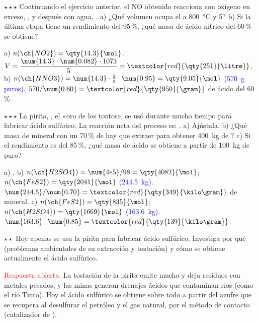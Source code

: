 \begin{exercise}
    \(\star\star\star\) Continuando el ejercicio anterior, el NO obtenido reacciona con oxígeno en exceso, ,
    y después con agua, . a) ¿Qué volumen ocupa el  a \qty{800}{\degreeCelsius} y
    \qty{5}{\atm}? b) Si la última etapa tiene un rendimiento del 95\,\%, ¿qué masa de ácido nítrico del 60\,\% se obtiene?
    \begin{solu}
        a) \textcolor{blue}{\(n(\ch{NO2}) = \qty{14.3}{\mol}\).} \(V = \dfrac{\num{14.3} \cdot \num{0.082} \cdot 1073}{5} =
        \textcolor{red}{\qty{251}{\litre}}\). b) \textcolor{blue}{\(n(\ch{HNO3}) = \num{14.3} \cdot \frac{2}{3} \cdot \num{0.95} =
        \qty{9.05}{\mol}\) (\qty{570}{\gram} puros).} \(570/\num{0.60} = \textcolor{red}{\qty{950}{\gram}}\) de ácido del 60\,\%.
    \end{solu}
\end{exercise}

\begin{exercise}
    \(\star\star\star\) La pirita, , el «oro de los tontos», se usó durante mucho tiempo para fabricar ácido sulfúrico. La
    reacción neta del proceso es: . a) Ajústala. b) ¿Qué masa de mineral con un 70\,\% de
     hay que extraer para obtener \qty{400}{\kilo\gram} de ? c) Si el rendimiento es del 85\,\%, ¿qué masa de
    ácido se obtiene a partir de \qty{100}{\kilo\gram} de  puro?
    \begin{solu}
        a) \textcolor{red}{}. b) \textcolor{blue}{\(n(\ch{H2SO4}) = \num{4e5}/98 =
        \qty{4082}{\mol}\); \(n(\ch{FeS2}) = \qty{2041}{\mol}\) (\qty{244.5}{\kilo\gram}).} \(\num{244.5}/\num{0.70} =
        \textcolor{red}{\qty{349}{\kilo\gram}}\) de mineral. c) \textcolor{blue}{\(n(\ch{FeS2}) = \qty{835}{\mol}\);
        \(n(\ch{H2SO4}) = \qty{1669}{\mol}\) (\qty{163.6}{\kilo\gram}).} \(\num{163.6} \cdot \num{0.85} = \textcolor{red}{\qty{139}{\kilo\gram}}\).
    \end{solu}
\end{exercise}

\begin{exercise}
    \(\star\star\) Hoy apenas se usa la pirita para fabricar ácido sulfúrico. Investiga por qué (problemas ambientales de su
    extracción y tostación) y cómo se obtiene actualmente el ácido sulfúrico.
    \begin{solu}
        \textcolor{red}{Respuesta abierta.} La tostación de la pirita emite mucho  y deja residuos con metales pesados, y las
        minas generan drenajes ácidos que contaminan ríos (como el río Tinto). Hoy el ácido sulfúrico se obtiene sobre todo a partir
        del azufre que se recupera al desulfurar el petróleo y el gas natural, por el método de contacto (catalizador de
        ).
    \end{solu}
\end{exercise}
